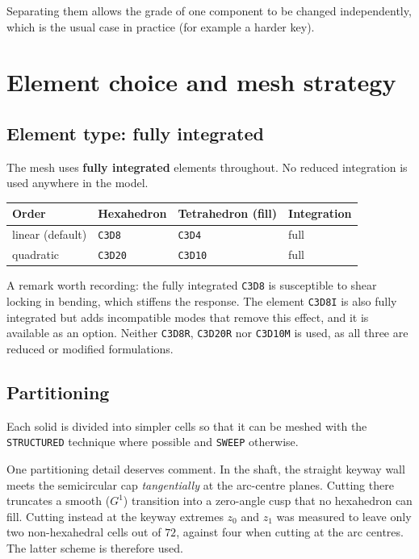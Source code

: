 \documentclass[11pt,a4paper]{article}
\newcommand{\id}[1]{\texttt{#1}}
\begin{document}
\noindent
Separating them allows the grade of one component to be changed independently,
which is the usual case in practice (for example a harder key).

\section{Element choice and mesh strategy}
\label{sec:mesh}

\subsection{Element type: fully integrated}
The mesh uses \textbf{fully integrated} elements throughout. No reduced
integration is used anywhere in the model.

\begin{center}
\begin{tabular}{llll}
\toprule
Order & Hexahedron & Tetrahedron (fill) & Integration \\
\midrule
linear (default) & \id{C3D8} & \id{C3D4} & full \\
quadratic & \id{C3D20} & \id{C3D10} & full \\
\bottomrule
\end{tabular}
\end{center}

\noindent
A remark worth recording: the fully integrated \id{C3D8} is susceptible to shear
locking in bending, which stiffens the response. The element \id{C3D8I} is also
fully integrated but adds incompatible modes that remove this effect, and it is
available as an option. Neither \id{C3D8R}, \id{C3D20R} nor \id{C3D10M} is used,
as all three are reduced or modified formulations.

\subsection{Partitioning}
Each solid is divided into simpler cells so that it can be meshed with the
\id{STRUCTURED} technique where possible and \id{SWEEP} otherwise.

One partitioning detail deserves comment. In the shaft, the straight keyway wall
meets the semicircular cap \emph{tangentially} at the arc-centre planes. Cutting
there truncates a smooth ($G^1$) transition into a zero-angle cusp that no
hexahedron can fill. Cutting instead at the keyway extremes $z_0$ and $z_1$ was
measured to leave only two non-hexahedral cells out of $72$, against four when
cutting at the arc centres. The latter scheme is therefore used.
\end{document}
